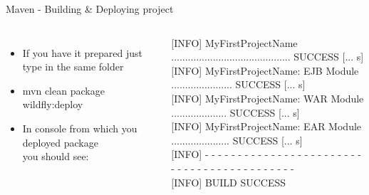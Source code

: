 \documentclass[aspectratio=1610,english]{beamer} %
\begin{document}
\begin{frame}{Maven - Building \& Deploying project}
\begin{columns}
				\begin{itemize}
					\tiny
					\color{black}
					\item If you have it prepared just type in the same folder
					\item mvn clean package wildfly:deploy
					\item In console from which you deployed package \\ you should see: 
				\end{itemize}
				\tiny
				{[INFO]} MyFirstProjectName ........................................... SUCCESS {[... s]} \\
{[INFO]} MyFirstProjectName: EJB Module ...................... SUCCESS {[... s]} \\
{[INFO]} MyFirstProjectName: WAR Module .................... SUCCESS {[... s]} \\
{[INFO]} MyFirstProjectName: EAR Module ..................... SUCCESS {[... s]} \\
{[INFO]} - - - - - - - - - - - - - - - - - - - - - - - - - - - - - - - - - - - - - - - - - - - \\
{[INFO]} BUILD SUCCESS \\				
				
				

\end{columns}
\end{frame}
\end{document}
